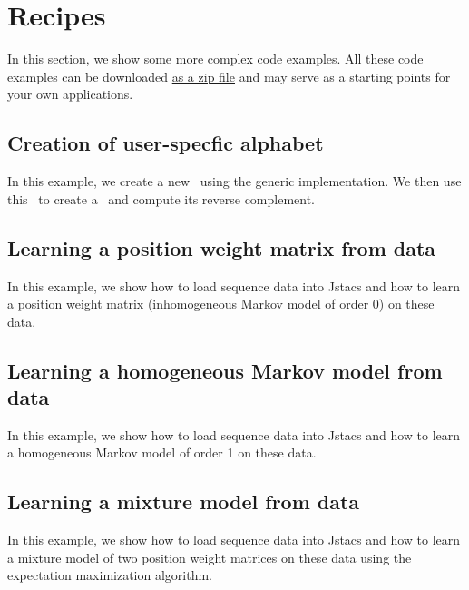 \section{Recipes}\label{recipes}


In this section, we show some more complex code examples. All these code examples can be downloaded \href{http://www.jstacs.de/downloads/recipes.zip}{as a zip file} and may serve as a starting points for your own applications.

\subsection{Creation of user-specfic alphabet}
In this example, we create a new \ComplementableDiscreteAlphabet~using the generic implementation. We then use this \Alphabet~to create a \Sequence~and compute its reverse complement.
\renewcommand{\codefile}{./recipes/AlphabetCreation.java}
\setcounter{off}{33}

\subsection{Learning a position weight matrix from data}
In this example, we show how to load sequence data into Jstacs and how to learn a position weight matrix (inhomogeneous Markov model of order 0) on these data.
\renewcommand{\codefile}{./recipes/TrainPWM.java}
\setcounter{off}{36}

\subsection{Learning a homogeneous Markov model from data}
In this example, we show how to load sequence data into Jstacs and how to learn a homogeneous Markov model of order 1 on these data.
\renewcommand{\codefile}{./recipes/TrainHomogeneousMM.java}
\setcounter{off}{35}

\subsection{Learning a mixture model from data}
In this example, we show how to load sequence data into Jstacs and how to learn a mixture model of two position weight matrices on these data using the expectation maximization algorithm.
\renewcommand{\codefile}{./recipes/CreateMixtureModel.java}
\setcounter{off}{35}

